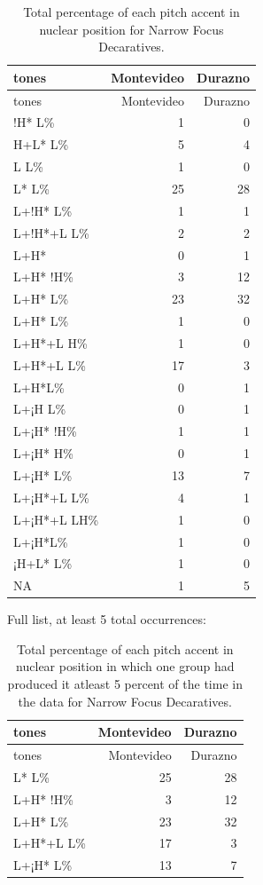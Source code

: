 \documentclass[
  man]{apa6}
\begin{document}
\begin{longtable}[]{@{}lrr@{}}
\caption{\label{tab:unnamed-chunk-6}Total percentage of each pitch accent in nuclear position for Narrow Focus Decaratives.}\tabularnewline
\toprule\noalign{}
tones & Montevideo & Durazno \\
\midrule\noalign{}
\endfirsthead
\toprule\noalign{}
tones & Montevideo & Durazno \\
\midrule\noalign{}
\endhead
\bottomrule\noalign{}
\endlastfoot
!H* L\% & 1 & 0 \\
H+L* L\% & 5 & 4 \\
L L\% & 1 & 0 \\
L* L\% & 25 & 28 \\
L+!H* L\% & 1 & 1 \\
L+!H*+L L\% & 2 & 2 \\
L+H* & 0 & 1 \\
L+H* !H\% & 3 & 12 \\
L+H* L\% & 23 & 32 \\
L+H* L\% & 1 & 0 \\
L+H*+L H\% & 1 & 0 \\
L+H*+L L\% & 17 & 3 \\
L+H*L\% & 0 & 1 \\
L+¡H L\% & 0 & 1 \\
L+¡H* !H\% & 1 & 1 \\
L+¡H* H\% & 0 & 1 \\
L+¡H* L\% & 13 & 7 \\
L+¡H*+L L\% & 4 & 1 \\
L+¡H*+L LH\% & 1 & 0 \\
L+¡H*L\% & 1 & 0 \\
¡H+L* L\% & 1 & 0 \\
NA & 1 & 5 \\
\end{longtable}

Full list, at least 5 total occurrences:

\begin{longtable}[]{@{}lrr@{}}
\caption{\label{tab:unnamed-chunk-7}Total percentage of each pitch accent in nuclear position in which one group had produced it atleast 5 percent of the time in the data for Narrow Focus Decaratives.}\tabularnewline
\toprule\noalign{}
tones & Montevideo & Durazno \\
\midrule\noalign{}
\endfirsthead
\toprule\noalign{}
tones & Montevideo & Durazno \\
\midrule\noalign{}
\endhead
\bottomrule\noalign{}
\endlastfoot
L* L\% & 25 & 28 \\
L+H* !H\% & 3 & 12 \\
L+H* L\% & 23 & 32 \\
L+H*+L L\% & 17 & 3 \\
L+¡H* L\% & 13 & 7 \\
\end{longtable}
\end{document}
